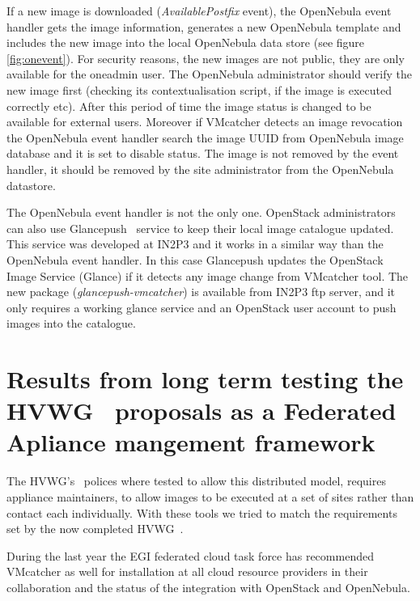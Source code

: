 \documentclass[oribibl]{llncs}
\begin{document}
If a new image is downloaded (\textit{AvailablePostfix} event), the OpenNebula event handler gets the image information, generates a new OpenNebula template and includes the new image into the local OpenNebula data store (see figure \ref{fig:onevent}). 
For security reasons, the new images are not public, they are only available for the oneadmin user. The OpenNebula administrator should verify the new image first (checking its contextualisation script, if the image is executed correctly etc).
After this period of time the image status is changed to be available for external users. 
Moreover if VMcatcher detects an image revocation the OpenNebula event handler search the image UUID from OpenNebula image database and it is set to disable status.
The image is not removed by the event handler, it should be removed by the site administrator from the OpenNebula datastore.

The OpenNebula event handler is not the only one. OpenStack administrators can also use Glancepush~\cite{glancepush} service to keep their local image catalogue updated. 
This service was developed at IN2P3 and it works in a similar way than the OpenNebula event handler. 
In this case Glancepush updates the OpenStack Image Service (Glance) if it detects any image change from VMcatcher tool. 
The new package (\textit{glancepush-vmcatcher}) is available from IN2P3 ftp server, and it only requires a working glance service and an OpenStack user account to push images into the catalogue.



\section{Results from long term testing the HVWG~\cite{hepix} proposals as a Federated Apliance mangement framework}
\label{sect-experiances}
The HVWG's~\cite{hepix} polices where tested to allow this distributed model, requires appliance maintainers, to allow images to be executed at a set of sites rather than contact each individually. With these tools we tried to match the requirements set by the now completed HVWG~\cite{hepix}.

During the last year the EGI federated cloud task force has recommended VMcatcher as well for installation at all cloud resource providers in their collaboration and the status of the integration with OpenStack and OpenNebula.
\end{document}
